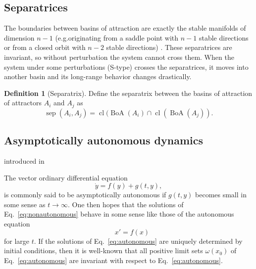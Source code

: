 \documentclass{article}
\theoremstyle{definition} \newtheorem{definition}{Definition}
\theoremstyle{remark} \newtheorem{remark}{Remark}
\newcommand{\sep}{\operatorname{sep}}
\newcommand{\cl}{\operatorname{cl}}
\newcommand{\boa}{\operatorname{BoA}}
\newcounter{ct}
\begin{document}
\subsection{Separatrices}\label{sec:sep}
The boundaries between basins of attraction are exactly the stable manifolds of dimension $n-1$ (e.g.originating from a saddle point with $n-1$ stable directions 
or from a closed orbit with $n-2$ stable directions) \citep{gruemm1975stable}.
These separatrices are invariant, so without  perturbation the system cannot cross them.
When the system under some perturbations (S-type) crosses the separatrices, it moves into another basin and its long-range behavior changes drastically.

\begin{definition}[Separatrix]\label{def:separatrix}
Define the separatrix between the basins of attraction of attractors $A_i$ and $A_j$ as 
\begin{equation}
\sep(A_i,A_j) = \cl(\boa(A_i)\cap \cl(\boa(A_j)).
\end{equation}
\end{definition}











\subsection{Asymptotically autonomous dynamics}\label{sec:asyauto}
introduced in \citep{markus1956asyauto}

The vector ordinary differential equation  
\begin{equation}\label{eq:nonautonomous}
 \dot y = f(y) + g(t, y),
\end{equation}
is commonly said to be asymptotically autonomous if \( g(t, y) \) becomes small in some sense as \( t \to \infty \). One then hopes that the solutions of Eq.~\ref{eq:nonautonomous} behave in some sense like those of the autonomous equation  
\begin{equation}\label{eq:autonomous}
\quad x' = f(x)
\end{equation}
for large \( t \). If the solutions of Eq.~\ref{eq:autonomous} are uniquely determined by initial conditions,   then it is well-known \cite{} that all positive limit sets \( \omega(x_0) \) of Eq.~\ref{eq:autonomous} are invariant with respect to Eq.~\ref{eq:autonomous}.
\end{document}
